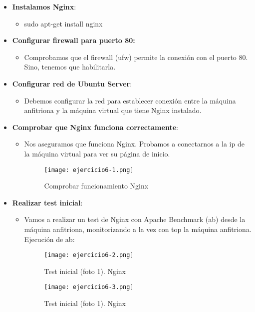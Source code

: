 	
	\begin{itemize}
		\item \textbf{Instalamos Nginx}:
			\begin{itemize}
				\item 	sudo apt-get install nginx
			\end{itemize}
		\item \textbf{Configurar firewall para puerto 80:} 
			\begin{itemize}
				\item Comprobamos que el firewall (ufw) permite la conexión con el puerto 80. Sino, tenemos que habilitarla.
			\end{itemize}
		\item \textbf{Configurar red de Ubuntu Server}:
			\begin{itemize}
				\item Debemos configurar la red para establecer conexión entre la máquina anfitriona y la máquina virtual que tiene Nginx instalado.
			\end{itemize}
		\item \textbf{Comprobar que Nginx funciona correctamente}:
			\begin{itemize}
				\item Nos aseguramos que funciona Nginx. Probamos a conectarnos a la ip de la máquina virtual para ver su página de inicio.
				\begin{figure}[H] 
					\centering
					\texttt{[image: ejercicio6-1.png]} 
					\label{figura27} 
					\caption{Comprobar funcionamiento Nginx}
				\end{figure}
			\end{itemize}
		\item \textbf{Realizar test inicial}:
			\begin{itemize}
				\item Vamos a realizar un test de Nginx con Apache Benchmark (ab) desde la máquina anfitriona, monitorizando a la vez con top la máquina anfitriona.\\
				
				Ejecución de ab:
				\begin{figure}[H] 
					\centering
					\texttt{[image: ejercicio6-2.png]} 
					\label{figura28} 
					\caption{Test inicial (foto 1). Nginx}
				\end{figure}
				\begin{figure}[H] 
					\centering
					\texttt{[image: ejercicio6-3.png]} 
					\label{figura29} 
					\caption{Test inicial (foto 1). Nginx}
				\end{figure}
				

\end{itemize}
\end{itemize}
